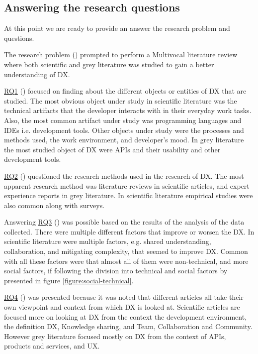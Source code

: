 \documentclass[english, 12pt, a4paper, sci, utf8, a-1b, online]{aaltothesis}
\begin{document}
\subsection{Answering the research questions}

At this point we are ready to provide an answer the research problem and questions.

The \hyperref[research-problem]{research problem} (\researchproblem) prompted to perform a Multivocal literature review where both scientific and grey literature was studied to gain a better understanding of DX.

\hyperref[RQ1]{RQ1} (\rqone) focused on finding about the different objects or entities of DX that are studied. The most obvious object under study in scientific literature was the technical artifacts that the developer interacts with in their everyday work tasks. Also, the most common artifact under study was programming languages and IDEs i.e. development tools. Other objects under study were the processes and methods used, the work environment, and developer's mood. In grey literature the most studied object of DX were APIs and their usability and other development tools.

\hyperref[RQ2]{RQ2} (\rqtwo) questioned the research methods used in the research of DX. The most apparent research method was literature reviews in scientific articles, and expert experience reports in grey literature. In scientific literature empirical studies were also common along with surveys.

Answering \hyperref[RQ3]{RQ3} (\rqthree) was possible based on the results of the analysis of the data collected. There were multiple different factors that improve or worsen the DX. In scientific literature were multiple factors, e.g. shared understanding, collaboration, and mitigating complexity, that seemed to improve DX. Common with all these factors were that almost all of them were non-technical, and more social factors, if following the division into technical and social factors by \textcite{fagerholm-doctoral-thesis} presented in figure \ref{figure:social-technical}.

\hyperref[RQ4]{RQ4} (\rqfour) was presented because it was noted that different articles all take their own viewpoint and context from which DX is looked at. Scientific articles are focused more on looking at DX from the context the development environment, the definition DX, Knowledge sharing, and Team, Collaboration and Community. However grey literature focused mostly on DX from the context of APIs, products and services, and UX.
\end{document}
